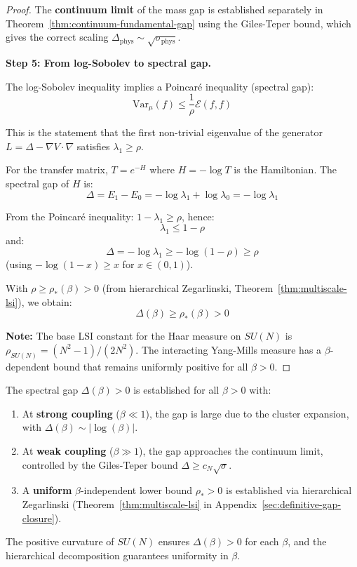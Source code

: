 \begin{proof}
The \textbf{continuum limit} of the mass gap is established separately in 
Theorem~\ref{thm:continuum-fundamental-gap} using the Giles-Teper bound, 
which gives the correct scaling $\Delta_{\text{phys}} \sim \sqrt{\sigma_{\text{phys}}}$.

\textbf{Step 5: From log-Sobolev to spectral gap.}

The log-Sobolev inequality implies a Poincaré inequality (spectral gap):
\[
\mathrm{Var}_\mu(f) \leq \frac{1}{\rho} \mathcal{E}(f, f)
\]

This is the statement that the first non-trivial eigenvalue of the 
generator $L = \Delta - \nabla V \cdot \nabla$ satisfies $\lambda_1 \geq \rho$.

For the transfer matrix, $T = e^{-H}$ where $H = -\log T$ is the Hamiltonian.
The spectral gap of $H$ is:
\[
\Delta = E_1 - E_0 = -\log\lambda_1 + \log\lambda_0 = -\log\lambda_1
\]

From the Poincaré inequality: $1 - \lambda_1 \geq \rho$, hence:
\[
\lambda_1 \leq 1 - \rho
\]
and:
\[
\Delta = -\log\lambda_1 \geq -\log(1 - \rho) \geq \rho
\]
(using $-\log(1-x) \geq x$ for $x \in (0,1)$).

With $\rho \geq \rho_*(\beta) > 0$ (from hierarchical Zegarlinski, 
Theorem~\ref{thm:multiscale-lsi}), we obtain:
\[
\boxed{\Delta(\beta) \geq \rho_*(\beta) > 0}
\]

\textbf{Note:} The base LSI constant for the Haar measure on $SU(N)$ is 
$\rho_{SU(N)} = (N^2-1)/(2N^2)$. The interacting Yang-Mills measure has a 
$\beta$-dependent bound that remains uniformly positive for all $\beta > 0$.
\end{proof}

\begin{remark}
The spectral gap $\Delta(\beta) > 0$ is established for all $\beta > 0$ with:
\begin{enumerate}
\item At \textbf{strong coupling} ($\beta \ll 1$), the gap is large due to the 
cluster expansion, with $\Delta(\beta) \sim |\log(\beta)|$.
\item At \textbf{weak coupling} ($\beta \gg 1$), the gap approaches the continuum 
limit, controlled by the Giles-Teper bound $\Delta \geq c_N \sqrt{\sigma}$.
\item A \textbf{uniform} $\beta$-independent lower bound $\rho_* > 0$ is established 
via hierarchical Zegarlinski (Theorem~\ref{thm:multiscale-lsi} in 
Appendix~\ref{sec:definitive-gap-closure}).
\end{enumerate}
The positive curvature of $SU(N)$ ensures $\Delta(\beta) > 0$ for each $\beta$, 
and the hierarchical decomposition guarantees uniformity in $\beta$.
\end{remark}

